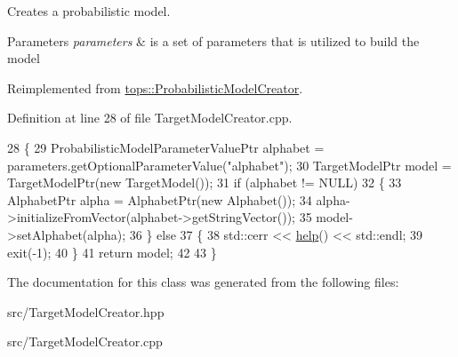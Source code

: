 Creates a probabilistic model. 


\begin{DoxyParams}{Parameters}
{\em parameters} & is a set of parameters that is utilized to build the model \\
\hline
\end{DoxyParams}


Reimplemented from \hyperlink{classtops_1_1ProbabilisticModelCreator_afed6c8ffa45fff446bdaa8b533da8f7c}{tops\+::\+Probabilistic\+Model\+Creator}.



Definition at line 28 of file Target\+Model\+Creator.\+cpp.


\begin{DoxyCode}
28                                                                                                   \{
29     ProbabilisticModelParameterValuePtr alphabet = parameters.getOptionalParameterValue(\textcolor{stringliteral}{"alphabet"});
30     TargetModelPtr model = TargetModelPtr(\textcolor{keyword}{new} TargetModel());
31     \textcolor{keywordflow}{if} (alphabet != NULL)
32       \{
33         AlphabetPtr alpha = AlphabetPtr(\textcolor{keyword}{new} Alphabet());
34         alpha->initializeFromVector(alphabet->getStringVector());
35         model->setAlphabet(alpha);
36       \} \textcolor{keywordflow}{else}
37       \{
38         std::cerr << \hyperlink{classtops_1_1TargetModelCreator_acb73685f7ad2619fa7faeb6709179f15}{help}() << std::endl;
39         exit(-1);
40       \}
41     \textcolor{keywordflow}{return} model;
42 
43   \}
\end{DoxyCode}


The documentation for this class was generated from the following files\+:\begin{DoxyCompactItemize}
\item 
src/Target\+Model\+Creator.\+hpp\item 
src/Target\+Model\+Creator.\+cpp\end{DoxyCompactItemize}
